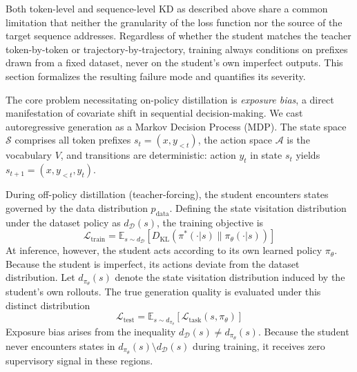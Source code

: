 \documentclass{article} %
\newcommand{\KL}{D_{\mathrm{KL}}}
\newcommand{\pdata}{p_{\mathrm{data}}}
\newcommand{\loss}{\mathcal{L}}
\begin{document}
Both token-level and sequence-level KD as described above share a common limitation that neither the granularity of the loss function nor the source of the target sequence addresses. Regardless of whether the student matches the teacher token-by-token or trajectory-by-trajectory, training always conditions on prefixes drawn from a fixed dataset, never on the student's own imperfect outputs. This section formalizes the resulting failure mode and quantifies its severity.

The core problem necessitating on-policy distillation is \textit{exposure bias}, a direct manifestation of covariate shift in sequential decision-making. We cast autoregressive generation as a Markov Decision Process (MDP). The state space $\mathcal{S}$ comprises all token prefixes $s_t = (x, y_{<t})$, the action space $\mathcal{A}$ is the vocabulary $V$, and transitions are deterministic: action $y_t$ in state $s_t$ yields $s_{t+1} = (x, y_{<t}, y_t)$.

During off-policy distillation (teacher-forcing), the student encounters states governed by the data distribution $\pdata$. Defining the state visitation distribution under the dataset policy as $d_{\mathcal{D}}(s)$, the training objective is
\begin{equation}
    \loss_{\mathrm{train}} = \mathbb{E}_{s \sim d_{\mathcal{D}}} \left[ \KL(\pi^*(\cdot|s) \parallel \pi_\theta(\cdot|s)) \right]
\end{equation}
At inference, however, the student acts according to its own learned policy $\pi_\theta$. Because the student is imperfect, its actions deviate from the dataset distribution. Let $d_{\pi_\theta}(s)$ denote the state visitation distribution induced by the student's own rollouts. The true generation quality is evaluated under this distinct distribution
\begin{equation}
    \loss_{\mathrm{test}} = \mathbb{E}_{s \sim d_{\pi_\theta}} \left[ \loss_{\mathrm{task}}(s, \pi_\theta) \right]
\end{equation}
Exposure bias arises from the inequality $d_{\mathcal{D}}(s) \neq d_{\pi_\theta}(s)$. Because the student never encounters states in $d_{\pi_\theta}(s) \setminus d_{\mathcal{D}}(s)$ during training, it receives zero supervisory signal in these regions.
\end{document}
